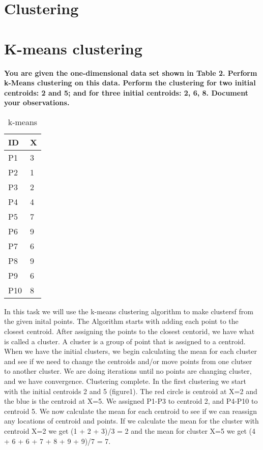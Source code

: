 \section{Clustering}

	\section*{K-means clustering}

	{\bf You are given the one-dimensional data set shown in Table 2. Perform k-Means
	clustering on this data. Perform the clustering for two initial centroids: 2 and
	5; and for three initial centroids: 2, 6, 8. Document your observations.}

	\noindent\makebox[\linewidth]{\rule{\textwidth}{1pt}} 

	\begin{wraptable}{l}{3cm}
		\begin{tabular}{| p{1cm} | p{1cm} |}
			\hline
			{\bf ID} & {\bf X} \\ \hline
			P1 & 3 \\
			P2 & 1 \\
			P3 & 2 \\
			P4 & 4 \\
			P5 & 7 \\
			P6 & 9 \\
			P7 & 6 \\
			P8 & 9 \\
			P9 & 6 \\
			P10 & 8 \\ \hline
		\end{tabular}
		\caption{k-means}
	\end{wraptable}
	In this task we will use the k-means clustering algorithm to make 
	clustersf from the given inital points.
	The Algorithm starts with adding each point to the closest centroid. 
	After assigning the points
	to the closest centorid, we have what is called a cluster. A cluster is a 
	group of point that is assigned to a centroid. 
	When we have the initial clusters, we begin calculating the mean for each 
	cluster and see if we need to change the centroids and/or move points from
	one clutser to another cluster. 
	We are doing iterations until no points are changing cluster, and we have
	convergence. Clustering complete.
	In the first clustering we start with the initial centroids 2 and 5 (figure1).
	The red circle is centroid at X=2 and the blue is the centroid at X=5.
	We assigned P1-P3 to centroid 2, and P4-P10 to centroid 5.
	We now calculate the mean for each centroid to see if we can reassign any
	locations of centroid and points. If we calculate the mean for the cluster 
	with centroid X=2 we get (1 + 2 + 3)/3 = 2 and the mean for cluster X=5 we
	get (4 + 6 + 6 + 7 + 8 + 9 + 9)/7 = 7. 

